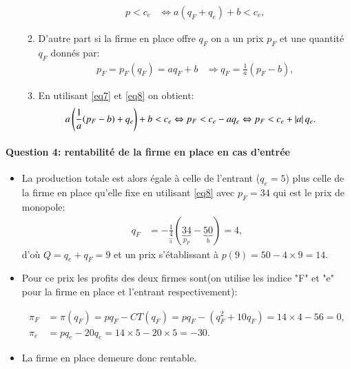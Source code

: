 \begin{frame}
\begin{itemize}
\begin{enumerate}[$\cdot$]
\begin{align}
p < c_e &\Leftrightarrow  a(q_F + q_e ) + b < c_e,
\label{eq7}
\end{align}
\item D'autre part si la firme en place offre $q_F$ on a un prix $p_F$ et une quantité $q_F$ donnés par:
\begin{align}
p_F = p_F(q_F) = aq_F+ b  &\Rightarrow q_F = \frac{1}{a}(p_F - b),
\label{eq8}
\end{align}
\item En utilisant \eqref{eq7} et \eqref{eq8} on obtient:
\begin{align*}
a\left( \frac{1}{a}(p_F - b) +  q_e \right) + b < c_e &\Leftrightarrow  p_F < c_e - aq_e \Leftrightarrow p_F < c_e + \left\vert {a} \right\vert q_e.
\end{align*}
\end{enumerate}
\end{itemize}
\end{frame}

\begin{frame}
[allowframebreaks]{\insertsection}
\framesubtitle{Question 4: rentabilité de la firme en place en cas d'entrée}
\begin{itemize}
\item La production totale est alors égale à celle de l’entrant ($q_e = 5$) plus celle de
 la firme en place qu'elle fixe  en utilisant \eqref{eq8} avec $p_F = 34$
qui est le prix de monopole:
\begin{align*}
q_F &=  -\frac{1}{\underbrace{4}_{a}}(\underbrace{34}_{p_F} - \underbrace{50}_{b}) = 4,
\end{align*}
d'où $Q = q_e+q_F = 9$ et un prix s'établissant à $p(9) = 50 - 4\times 9 = 14$.
\item Pour ce prix les profits des deux firmes sont(on utilise les indice "F" et "e" pour la firme en place et l'entrant respectivement):

\begin{align*}
\pi_F &= \pi(q_F) = pq_F - CT(q_F) = pq_F-(q_F^2 + 10q_F) = 14\times 4 - 56 = 0,\\
\pi_e &= pq_e - 20 q_e= 14\times 5 - 20\times 5 = -30.
\end{align*}
\item La firme en place demeure donc rentable.
\end{itemize}
\end{frame}

